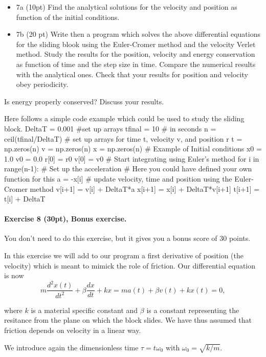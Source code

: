 \documentclass[%
oneside,                 %
final,                   %
10pt]{article}
\begin{document}
\begin{itemize}
\item 7a (10pt) Find the analytical solutions for the velocity and position as function of the initial conditions. 

\item 7b (20 pt)  Write then a program which solves the above differential equations for the sliding blook using the Euler-Cromer  method and the velocity Verlet method. Study the results for the position, velocity and energy conservation as function of time and the step size in time. Compare the numerical results with the analytical ones. Check that your results for position and velocity obey periodicity. 
\end{itemize}

\noindent
Is energy properly conserved? Discuss your results. 

Here follows a simple code example which could be used to study the sliding block.
\bpycod
DeltaT = 0.001
#set up arrays 
tfinal = 10 # in seconds
n = ceil(tfinal/DeltaT)
# set up arrays for time t, velocity v, and position r
t = np.zeros(n)
v = np.zeros(n)
x = np.zeros(n)
# Example of Initial conditions
x0 = 1.0
v0 = 0.0
r[0] = r0
v[0] = v0
# Start integrating using Euler's method
for i in range(n-1):
    # Set up the acceleration
    # Here you could have defined your own function for this
    a = -x[i]
    # update velocity, time and position using the Euler-Cromer method
    v[i+1] = v[i] + DeltaT*a
    x[i+1] = x[i] + DeltaT*v[i+1]
    t[i+1] = t[i] + DeltaT
\epycod


\paragraph{Exercise 8 (30pt), Bonus exercise.}
You don't need to do this exercise, but it gives you a bonus score of 30 points.

In this exercise we will add to our program a first derivative of position (the velocity) which is meant to mimick the role of friction.
Our differential equation is now
\[
m\frac{d^2x(t)}{dt^2}+\beta\frac{dx}{dt}+kx=ma(t)+\beta v(t)+kx(t)=0,
\]

where $k$ is a material specific constant and $\beta$ is a constant
representing the resitance from the plane on which the block slides.
We have thus assumed that friction depends on velocity in a linear
way.

We introduce again the dimensionless time $\tau = t\omega_0$ with
$\omega_0=\sqrt{k/m}$.
\end{document}

